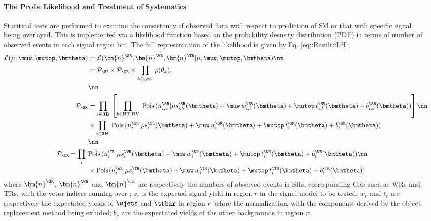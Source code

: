 \paragraph{The Profle Likelihood and Treatment of Systematics}
Statitical tests are performed to examine the consistency of observed data with respect to prediction of SM or that with specific signal being overlayed. This is implemented via a likelihood function based on the probability desnsity distribution (PDF) in terms of number of observed events in each signal region bin. The full representation of the likelihood is given by Eq. \ref{eq::Result::LH}:
\begin{align}
 \mathcal{L} (\mu; \muw, \mutop, \bmtheta)  
 & =  \mathcal{L} ( \bm{n}^{\SR}, \bm{n}^{\WR}, \bm{n}^{\TR} | \mu, \muw, \mutop, \bmtheta) \nn \\
  & = \mathcal{P}_{\SR} \times \mathcal{P}_{\CR}  \times \prod_{k\in \mathrm{syst.}} \rho(\theta_k), \\
& \nn \\
% 
  \mathcal{P}_{\SR} & = \prod_{i\notin \textbf{3B}} \,\, \left[ \prod_{b \in \mathrm{BT}, \mathrm{BV}} \,\, \mathrm{Pois}\, (n^{\SR}_{i,b} | \mu s^{\SR}_{i,b}(\bmtheta) + \muw \,  w^{\SR}_{i,b}(\bmtheta) + \mutop \,  t^{\SR}_{i,b}(\bmtheta) + b^{\SR}_{i,b}(\bmtheta)) \right] \nn \\
& \times \prod_{i\in \textbf{3B}} \,\, \mathrm{Pois}\, (n^{\SR}_i | \mu s^{\SR}_i(\bmtheta) + \muw \,  w^{\SR}_i(\bmtheta) + \mutop \,  t^{\SR}_i(\bmtheta) + b^{\SR}_i(\bmtheta))  \\
& \nn\\
%
  \mathcal{P}_{\CR} =  \prod_i \,\,
  &        \mathrm{Pois}\, (n^{\TR}_i | \mu s^{\WR}_i(\bmtheta) + \muw \,  w^{\WR}_i(\bmtheta) + \mutop \,  t^{\WR}_i(\bmtheta) + b^{\WR}_i(\bmtheta))  \nn \\
  & \times \mathrm{Pois}\, (n^{\WR}_i | \mu s^{\TR}_i(\bmtheta) + \muw \,  w^{\TR}_i(\bmtheta) + \mutop \,  t^{\TR}_i(\bmtheta) + b^{\TR}_i(\bmtheta))  
\label{eq::Result::LH}
\end{align}
where 
$\bm{n}^{\SR}$, $\bm{n}^{\WR}$ and $\bm{n}^{\TR}$ are respectively the numbers of observed events in SRs, corresponding CRs such as WRs and TRs, with the vetor indices running over ;
$s_{r}$ is the expected signal yield in region $r$ in the signal model to be tested;
$w_{r}$ and $t_{r}$ are respectively the expectated yields of $\wjets$ and $\ttbar$ in region $r$ before the normalization, with the components derived by the object replacement method being exluded;
$b_{r}$ are the expectated yields of the other backgrounds in region $r$;
